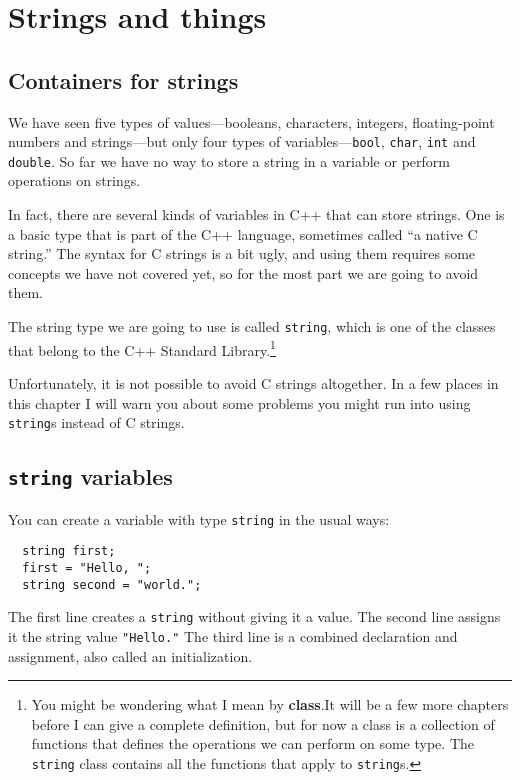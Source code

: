 


\chapter{Strings and things}
\label{strings}

\section{Containers for strings}

We have seen five types of values---booleans, characters, integers,
floating-point numbers and strings---but only four types of
variables---{\tt bool}, {\tt char}, {\tt int} and {\tt double}.  So
far we have no way to store a string in a variable or perform
operations on strings.

In fact, there are several kinds of variables in C++ that
can store strings.  One is a basic type that is part of the C++
language, sometimes called ``a native C string.''  The syntax
for C strings is a bit ugly, and using them requires some concepts
we have not covered yet, so for the most part we are going to
avoid them.

The string type we are going to use is called {\tt string}, which is
one of the classes that belong to the C++ Standard Library.\footnote{You might be wondering what I mean by {\bf class}.It will be a few
more chapters before I can give a complete definition, but for now a
class is a collection of functions that defines the operations we
can perform on some type.  The {\tt string} class contains all
the functions that apply to {\tt string}s.}

Unfortunately, it is not possible to avoid C strings altogether.
In a few places in this chapter I will warn you about some problems
you might run into using {\tt string}s instead of C strings.

\section{{\tt string} variables}

You can create a variable with type {\tt string} in the usual
ways:

\begin{verbatim}
  string first;
  first = "Hello, ";
  string second = "world.";
\end{verbatim}
%
The first line creates a {\tt string} without giving it a value.
The second line assigns it the string value {\tt "Hello."}
The third line is a combined declaration and assignment, also
called an initialization.

